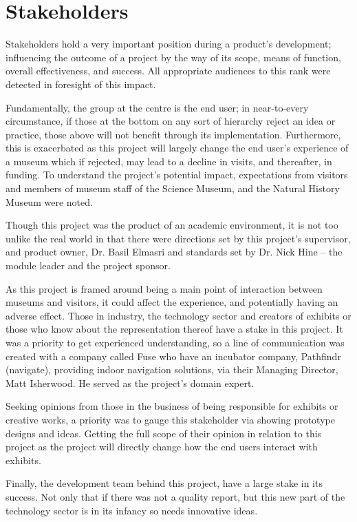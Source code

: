 \section{Stakeholders}
Stakeholders hold a very important position during a product's development; influencing the outcome of a project by the way of its scope, means of function, overall effectiveness, and success. All appropriate audiences to this rank were detected in foresight of this impact.

Fundamentally, the group at the centre is the end user; in near-to-every circumstance, if those at the bottom on any sort of hierarchy reject an idea or practice, those above will not benefit through its implementation. Furthermore, this is exacerbated as this project will largely change the end user’s experience of a museum which if rejected, may lead to a decline in visits, and thereafter, in funding. To understand the project's potential impact, expectations from visitors and members of museum staff of the Science Museum, and the Natural History Museum were noted. 

Though this project was the product of an academic environment, it is not too unlike the real world in that there were directions set by this project’s supervisor, and product owner, Dr. Basil Elmasri and standards set by Dr. Nick Hine – the module leader and the project sponsor.

As this project is framed around being a main point of interaction between museums and visitors, it could affect the experience, and potentially having an adverse effect. Those in industry, the technology sector and creators of exhibits or those who know about the representation thereof have a stake in this project. It was a priority to get experienced understanding, so a line of communication was created with a company called Fuse who have an incubator company, Pathfindr (navigate), providing indoor navigation solutions, via their Managing Director, Matt Isherwood. He served as the project's domain expert.

Seeking opinions from those in the business of being responsible for exhibits or creative works, a priority was to gauge this stakeholder via showing prototype designs and ideas. Getting the full scope of their opinion in relation to this project as the project will directly change how the end users interact with exhibits.

Finally, the development team behind this project, have a large stake in its success. Not only that if there was not a quality report, but this new part of the technology sector is in its infancy so needs innovative ideas.

